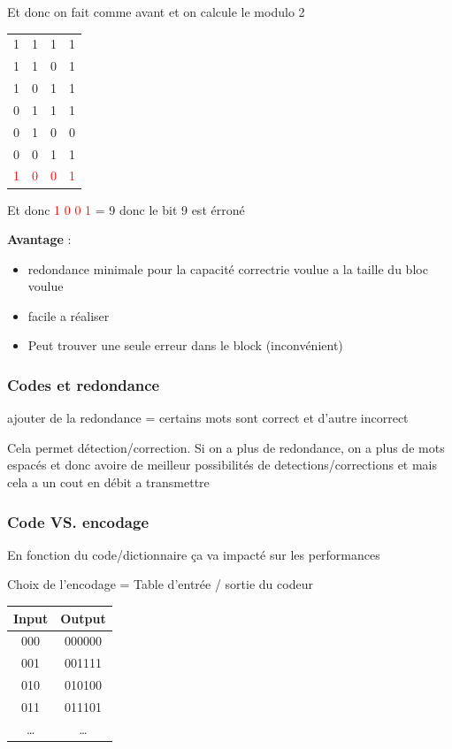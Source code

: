 				Et donc on fait comme avant et on calcule le modulo 2
				
				\begin{tabular}{cccc}
				1 & 1 & 1 & 1\\
				1 & 1 & 0 & 1\\
				1 & 0 & 1 & 1\\
				0 & 1 & 1 & 1\\
				0 & 1 & 0 & 0\\
				0 & 0 & 1 & 1\\ \hline
				\textcolor{red}{1} & \textcolor{red}{0} & \textcolor{red}{0} & \textcolor{red}{1}
				
				\end{tabular}
				
				Et donc \textcolor{red}{1} \textcolor{red}{0} \textcolor{red}{0} \textcolor{red}{1} = 9 donc le bit 9 est érroné
				
			\textbf{Avantage} :
			\begin{itemize}
				\item redondance minimale pour la capacité correctrie voulue a la taille du bloc voulue
				\item facile a réaliser
				\item Peut trouver une seule erreur dans le block (inconvénient)
			\end{itemize}
			
		\subsubsection{Codes et redondance}
			ajouter de la redondance = certains mots sont correct et d'autre incorrect
			
			Cela permet détection/correction. Si on a plus de redondance, on a plus de mots espacés et donc avoire de meilleur possibilités de detections/corrections et mais cela a un cout en débit a transmettre
			
		\subsubsection{Code VS. encodage}
			En fonction du code/dictionnaire ça va impacté sur les performances
			
			Choix de l'encodage  = Table d'entrée / sortie du codeur
			
			\begin{tabular}{|c|c|}
			\hline
			Input & Output\\ \hline
			000 & 000000 \\ \hline
			001 & 001111 \\ \hline
			010 & 010100 \\ \hline
			011 & 011101 \\ \hline
			\dots & \dots \\ \hline
			
			\end{tabular}
			
